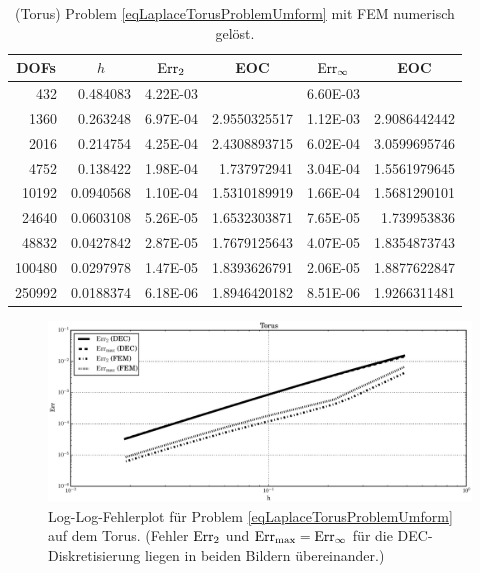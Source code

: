 \begin{beispiel}[Torus]
\begin{table}[htbp]
       \label{tabLaplaceTorusDEC}
       \vspace{20pt}
       \begin{tabular}{|r|r|r|r|r|r|}
       \hline
       \multicolumn{1}{|c|}{DOFs} & \multicolumn{1}{c|}{\( h \)} & \multicolumn{1}{c|}{\( \text{Err}_{2} \)} & \multicolumn{1}{c|}{EOC} &
       \multicolumn{1}{c|}{ \( \text{Err}_{\infty} \)} & \multicolumn{1}{c|}{EOC} \\ \hline
        432 & 0.484083 & 4.22E-03 & \multicolumn{1}{l|}{} & 6.60E-03 & \multicolumn{1}{l|}{} \\ \hline
        1360 & 0.263248 & 6.97E-04 & 2.9550325517 & 1.12E-03 & 2.9086442442 \\ \hline
        2016 & 0.214754 & 4.25E-04 & 2.4308893715 & 6.02E-04 & 3.0599695746 \\ \hline
        4752 & 0.138422 & 1.98E-04 & 1.737972941 & 3.04E-04 & 1.5561979645 \\ \hline
        10192 & 0.0940568 & 1.10E-04 & 1.5310189919 & 1.66E-04 & 1.5681290101 \\ \hline
        24640 & 0.0603108 & 5.26E-05 & 1.6532303871 & 7.65E-05 & 1.739953836 \\ \hline
        48832 & 0.0427842 & 2.87E-05 & 1.7679125643 & 4.07E-05 & 1.8354873743 \\ \hline
        100480 & 0.0297978 & 1.47E-05 & 1.8393626791 & 2.06E-05 & 1.8877622847 \\ \hline
        250992 & 0.0188374 & 6.18E-06 & 1.8946420182 & 8.51E-06 & 1.9266311481 \\ \hline
       \end{tabular}
       \caption[Laplace auf Torus (FEM)]{(Torus) Problem \eqref{eqLaplaceTorusProblemUmform} mit FEM numerisch gelöst.}
       \label{tabLaplaceTorusFEM}
       \end{table}
    \end{beispiel}
      \begin{figure}[htbp]
        \centering\includegraphics[width=\textwidth]{bilder/laplaceTorus/errplot.eps}
        \caption[Fehlerplot (Laplace auf Torus)]
                {Log-Log-Fehlerplot für Problem \eqref{eqLaplaceTorusProblemUmform} auf dem Torus.
                 (Fehler \( \text{Err}_{2} \) und \( \text{Err}_{\max}=\text{Err}_{\infty} \) für die DEC-Diskretisierung liegen 
                  in beiden Bildern übereinander.)}
        \label{figFehlerPlotLaplaceTorus}
      \end{figure}



